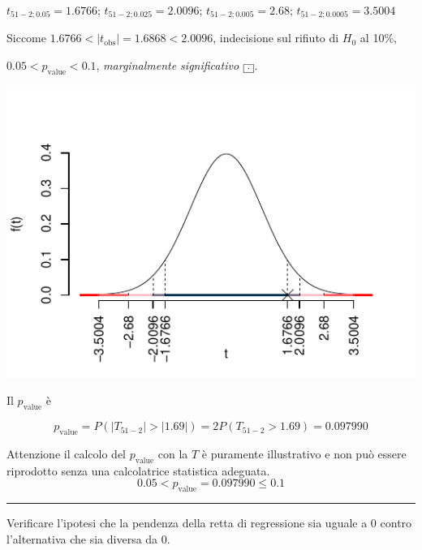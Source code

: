 \documentclass[
  11pt,
]{book}
\theoremstyle{mytheoremstyle}
\theoremstyle{mydefstyle}
\newenvironment{sol}
  {
  \begin{tcolorbox}[enhanced,breakable,arc=0.1mm,boxrule=1pt,colback=white,colframe=iblue,
  title=\bf \fontfamily{lmss}\selectfont \hspace{.5 cm} Soluzione,drop fuzzy shadow]

}{
\end{tcolorbox}
  }
\begin{document}
\begin{sol}
\(t_{51-2;0.05}=1.6766\); \(t_{51-2;0.025}=2.0096\); \(t_{51-2;0.005}=2.68\); \(t_{51-2;0.0005}=3.5004\)

Siccome \(1.6766<|t_\text{obs}|=1.6868<2.0096\), indecisione sul rifiuto di \(H_0\) al 10\%,

\(0.05<p_\text{value}<0.1\), \emph{marginalmente significativo} \(\fbox{.}\).

\begin{center}\includegraphics{Esami_passati_con_soluzioni_files/figure-latex/06-regr-3,-1} \end{center}

Il \(p_{\text{value}}\) è

\[ p_{\text{value}} = P(|T_{51-2}|>|1.69|)=2P(T_{51-2}>1.69)=0.097990 \]

Attenzione il calcolo del \(p_\text{value}\) con la \(T\) è puramente illustrativo e non può essere riprodotto senza una calcolatrice statistica adeguata.\[
 0.05 < p_\text{value}= 0.097990 \leq 0.1 
\]

\end{sol}

\begin{center}\rule{0.5\linewidth}{0.5pt}\end{center}

Verificare l'ipotesi che la pendenza della retta di regressione sia uguale a 0
contro l'alternativa che sia diversa da 0.
\end{document}
